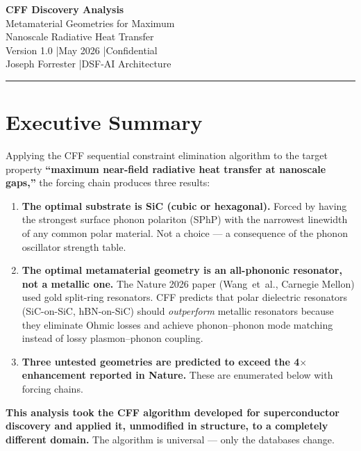 \documentclass[11pt, a4paper]{article}
\begin{document}
\begin{center}
  {\LARGE \textbf{CFF Discovery Analysis}}\\[6pt]
  {\large Metamaterial Geometries for Maximum}\\[2pt]
  {\large Nanoscale Radiative Heat Transfer}\\[10pt]
  {\color{nm-gray}\small Version 1.0 \quad|\quad May 2026 \quad|\quad Confidential}\\[4pt]
  {\color{nm-gray}\small Joseph Forrester \quad|\quad DSF-AI Architecture}
\end{center}

\vspace{1em}\hrule\vspace{1em}

\section*{Executive Summary}

Applying the CFF sequential constraint elimination algorithm
to the target property \textbf{``maximum near-field radiative
heat transfer at nanoscale gaps,''} the forcing chain produces
three results:

\begin{enumerate}[nosep]
  \item \textbf{The optimal substrate is SiC (cubic or hexagonal).}
        Forced by having the strongest surface phonon polariton
        (SPhP) with the narrowest linewidth of any common polar
        material. Not a choice --- a consequence of the phonon
        oscillator strength table.
  \item \textbf{The optimal metamaterial geometry is an
        all-phononic resonator, not a metallic one.} The Nature
        2026 paper (Wang~et~al., Carnegie Mellon) used gold
        split-ring resonators. CFF predicts that polar dielectric
        resonators (SiC-on-SiC, hBN-on-SiC) should
        \emph{outperform} metallic resonators because they
        eliminate Ohmic losses and achieve phonon--phonon
        mode matching instead of lossy plasmon--phonon coupling.
  \item \textbf{Three untested geometries are predicted to
        exceed the 4$\times$ enhancement reported in Nature.}
        These are enumerated below with forcing chains.
\end{enumerate}

\textbf{This analysis took the CFF algorithm developed for
superconductor discovery and applied it, unmodified in
structure, to a completely different domain.} The algorithm
is universal --- only the databases change.
\end{document}
